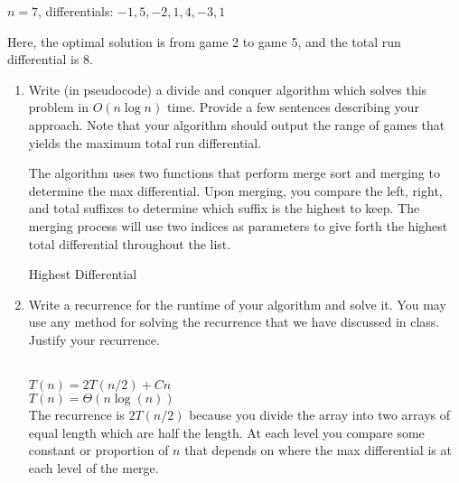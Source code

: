 \documentclass[11pt]{article}
\theoremstyle{definition}
\theoremstyle{theorem}
\newcommand{\solution}[1]{\medskip\noindent{\color{DarkBlue}\textbf{Solution:}} #1}
\newcommand{\solution}[1]{}
\begin{document}
$n=7$,
differentials: $-1, 5, -2, 1, 4, -3, 1$

Here, the optimal solution is from game 2 to game 5, and the total run differential is 8.





\begin{enumerate}[label=(\alph*)]
\item Write (in pseudocode) a divide and conquer algorithm which solves this problem in $O(n \log n)$ time. Provide a few sentences describing your approach. Note that your algorithm should output the range of games that yields the maximum total run differential.

\solution
The algorithm uses two functions that perform merge sort and merging to determine the max differential. Upon merging, you compare the left, right, and total suffixes to determine which suffix is the highest to keep. The merging process will use two indices as parameters to give forth the highest total differential throughout the list.
\begin{algorithm}[H]
\caption{Highest Differential}
\end{algorithm}



\item Write a recurrence for the runtime of your algorithm and solve it. You may use any method for solving the recurrence that we have discussed in class. Justify your recurrence.



\solution \\
$T(n) = 2T(n/2) + Cn$ \\
$T(n) = \Theta(n\log(n))$ \\
The recurrence is $2T(n/2)$ because you divide the array into two arrays of equal length which are half the length. At each level you compare some constant or proportion of $n$ that depends on where the max differential is at each level of the merge.

\end{enumerate}
\end{document}
